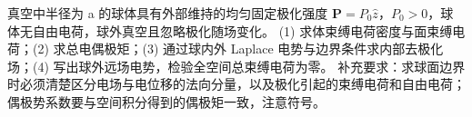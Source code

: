 真空中半径为 a 的球体具有外部维持的均匀固定极化强度 \(\boldsymbol P=P_0\hat z\)，\(P_0>0\)，球体无自由电荷，球外真空且忽略极化随场变化。
(1) 求体束缚电荷密度与面束缚电荷；(2) 求总电偶极矩；(3) 通过球内外 Laplace 电势与边界条件求内部去极化场；(4) 写出球外远场电势，检验全空间总束缚电荷为零。
补充要求：求球面边界时必须清楚区分电场与电位移的法向分量，以及极化引起的束缚电荷和自由电荷；偶极势系数要与空间积分得到的偶极矩一致，注意符号。
